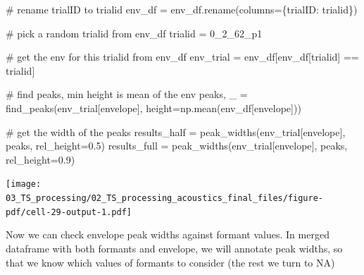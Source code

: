 \documentclass[
  letterpaper,
  DIV=11,
  numbers=noendperiod]{scrreprt}
\newenvironment{Shaded}{\begin{snugshade}}{\end{snugshade}}
\newcommand{\CommentTok}[1]{\textcolor[rgb]{0.37,0.37,0.37}{#1}}
\newcommand{\FloatTok}[1]{\textcolor[rgb]{0.68,0.00,0.00}{#1}}
\newcommand{\NormalTok}[1]{\textcolor[rgb]{0.00,0.23,0.31}{#1}}
\newcommand{\OperatorTok}[1]{\textcolor[rgb]{0.37,0.37,0.37}{#1}}
\newcommand{\StringTok}[1]{\textcolor[rgb]{0.13,0.47,0.30}{#1}}
\begin{document}
\begin{Shaded}
\begin{Highlighting}[]
\CommentTok{\# rename trialID to trialid}
\NormalTok{env\_df }\OperatorTok{=}\NormalTok{ env\_df.rename(columns}\OperatorTok{=}\NormalTok{\{}\StringTok{\textquotesingle{}trialID\textquotesingle{}}\NormalTok{: }\StringTok{\textquotesingle{}trialid\textquotesingle{}}\NormalTok{\})}

\CommentTok{\# pick a random trialid from env\_df}
\NormalTok{trialid }\OperatorTok{=} \StringTok{\textquotesingle{}0\_2\_62\_p1\textquotesingle{}}

\CommentTok{\# get the env for this trialid from env\_df}
\NormalTok{env\_trial }\OperatorTok{=}\NormalTok{ env\_df[env\_df[}\StringTok{\textquotesingle{}trialid\textquotesingle{}}\NormalTok{] }\OperatorTok{==}\NormalTok{ trialid]}

\CommentTok{\# find peaks, min height is mean of the env}
\NormalTok{peaks, \_ }\OperatorTok{=}\NormalTok{ find\_peaks(env\_trial[}\StringTok{\textquotesingle{}envelope\textquotesingle{}}\NormalTok{], height}\OperatorTok{=}\NormalTok{np.mean(env\_df[}\StringTok{\textquotesingle{}envelope\textquotesingle{}}\NormalTok{]))}

\CommentTok{\# get the width of the peaks}
\NormalTok{results\_half }\OperatorTok{=}\NormalTok{ peak\_widths(env\_trial[}\StringTok{\textquotesingle{}envelope\textquotesingle{}}\NormalTok{], peaks, rel\_height}\OperatorTok{=}\FloatTok{0.5}\NormalTok{)}
\NormalTok{results\_full }\OperatorTok{=}\NormalTok{ peak\_widths(env\_trial[}\StringTok{\textquotesingle{}envelope\textquotesingle{}}\NormalTok{], peaks, rel\_height}\OperatorTok{=}\FloatTok{0.9}\NormalTok{)}
\end{Highlighting}
\end{Shaded}

\texttt{[image: 03\_TS\_processing/02\_TS\_processing\_acoustics\_final\_files/figure-pdf/cell-29-output-1.pdf]}

Now we can check envelope peak widths against formant values. In merged
dataframe with both formants and envelope, we will annotate peak widths,
so that we know which values of formants to consider (the rest we turn
to NA)
\end{document}
